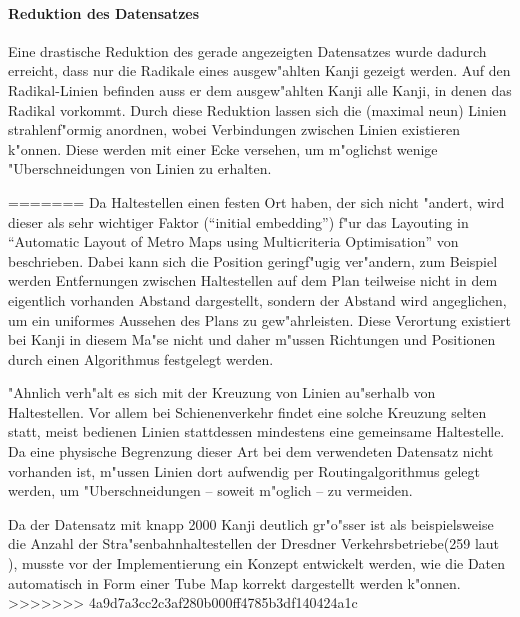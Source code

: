 \paragraph{Reduktion des Datensatzes}
Eine drastische Reduktion des gerade angezeigten Datensatzes wurde dadurch erreicht, dass nur die Radikale eines ausgew"ahlten Kanji gezeigt werden. Auf den Radikal-Linien befinden auss er dem ausgew"ahlten Kanji alle Kanji, in denen das Radikal vorkommt. Durch diese Reduktion lassen sich die (maximal neun) Linien strahlenf"ormig anordnen, wobei Verbindungen zwischen Linien existieren k"onnen. Diese werden mit einer Ecke versehen, um m"oglichst wenige "Uberschneidungen von Linien zu erhalten. 

=======
Da Haltestellen einen festen Ort haben, der sich nicht "andert, wird dieser als sehr wichtiger Faktor ("`initial embedding"') f"ur das Layouting in "`Automatic Layout of Metro Maps using Multicriteria Optimisation"' von \cite{automaticlayoutmetro08} beschrieben. Dabei kann sich die Position geringf"ugig ver"andern, zum Beispiel werden Entfernungen zwischen Haltestellen auf dem Plan teilweise nicht in dem eigentlich vorhanden Abstand dargestellt, sondern der Abstand wird angeglichen, um ein uniformes Aussehen des Plans zu gew"ahrleisten. Diese Verortung existiert bei Kanji in diesem Ma"se nicht und daher m"ussen Richtungen und Positionen durch einen Algorithmus festgelegt werden. 

"Ahnlich verh"alt es sich mit der Kreuzung von Linien au"serhalb von Haltestellen. Vor allem bei Schienenverkehr findet eine solche Kreuzung selten statt, meist bedienen Linien stattdessen mindestens eine gemeinsame Haltestelle. Da eine physische Begrenzung dieser Art bei dem verwendeten Datensatz nicht vorhanden ist, m"ussen Linien dort aufwendig per Routingalgorithmus gelegt werden, um "Uberschneidungen – soweit m"oglich – zu vermeiden.

Da der Datensatz mit knapp 2000 Kanji deutlich gr"o"sser ist als beispielsweise die Anzahl der Stra"senbahnhaltestellen der Dresdner Verkehrsbetriebe(259 laut \cite{dvbag}), musste vor der Implementierung ein Konzept entwickelt werden, wie die Daten automatisch in Form einer Tube Map korrekt dargestellt werden k"onnen.
>>>>>>> 4a9d7a3cc2c3af280b000ff4785b3df140424a1c
